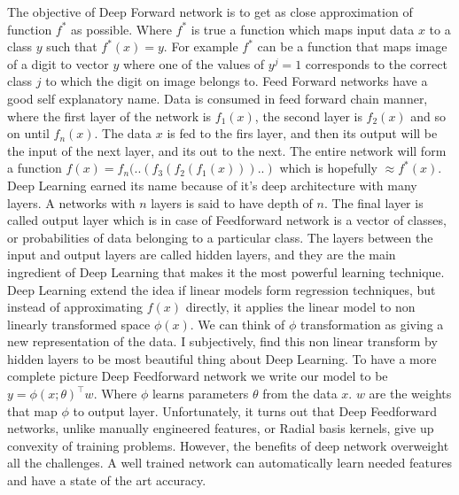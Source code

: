 \documentclass[paper=a4, fontsize=11pt]{scrartcl}
\numberwithin{equation}{section}		%
\numberwithin{figure}{section}			%
\numberwithin{table}{section}			%
\begin{document}
	\par 
		The objective of Deep Forward network is to get as close approximation of function $f^*$ as possible. Where $f^*$ is true a function which maps input data $x$ to a class $y$ such that $ f^*(x) = y $. For example $f^*$ can be a function that maps image of a digit to vector $y$ where one of the values of $y^j = 1$ corresponds to the correct class $j$ to which the digit on image belongs to.
	Feed Forward networks have a good self explanatory name. Data is consumed in feed forward chain manner, where the first layer of the network is $f_1(x)$, the second layer is $f_2(x)$ and so on until $f_n(x)$. The data $x$ is fed to the firs layer, and then its output will be the input of the next layer, and its out to the next. The entire network will form a function $f(x) = f_n(..(f_3(f_2(f_1(x)))..) $ which is hopefully $\approx f^*(x)$. Deep Learning earned its name because of it's deep architecture with many layers. A networks with $n$ layers is said to have depth of $n$. The final layer is called output layer which is in case of Feedforward network is a vector of classes, or probabilities of data belonging to a particular class. The layers between the input and output layers are called hidden layers, and they are the main ingredient of Deep Learning that makes it the most powerful learning technique. Deep Learning extend the idea if linear models form regression techniques, but instead of approximating $f(x)$ directly, it applies the linear model to non linearly transformed space $\phi(x)$. We can think of $\phi$ transformation as giving a new representation of the data. I subjectively, find this non linear transform by hidden layers to be most beautiful thing about Deep Learning. To have a more complete picture Deep Feedforward network we write our model to be $y = \phi(x;\theta)^\top w $. Where $\phi$ learns parameters $\theta$ from the data $x$. $w$ are the weights that map $\phi$ to output layer.
	Unfortunately, it turns out that Deep Feedforward networks, unlike manually engineered features, or Radial basis kernels, give up convexity of training problems. However, the benefits of deep network overweight all the challenges. A well trained network can automatically learn needed features and have a state of the art accuracy.
	
	
\end{document}
